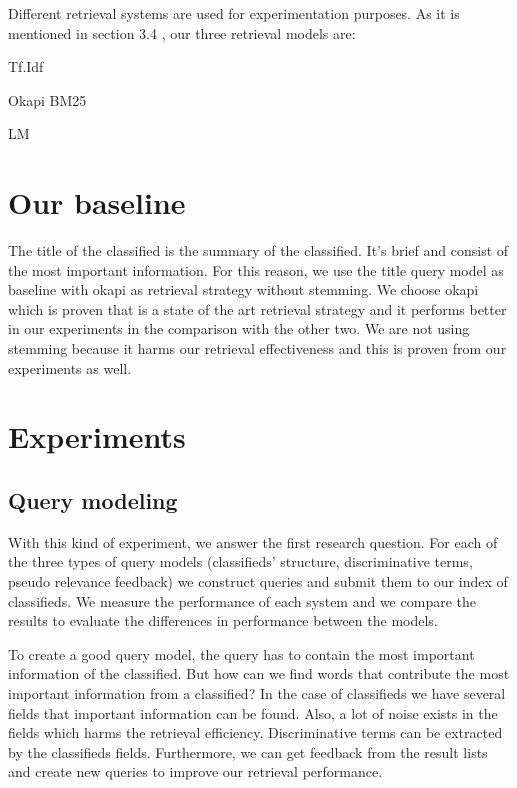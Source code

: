 Different retrieval systems are used for experimentation purposes. As it is mentioned in section 3.4 , our three retrieval models are:
\begin{list}{.}{}
\item{Tf.Idf}
\item{Okapi BM25}
\item{LM}
\end{list}

\section{Our baseline}
The title of the classified is the summary of the classified. It's brief and consist of the most important information. For this reason, we use the title query model as baseline with okapi as retrieval strategy without stemming. We choose okapi which is proven that is a state of the art retrieval strategy and it performs better in our experiments in the comparison with the other two. We are not using stemming because it harms our retrieval effectiveness and this is proven from our experiments as well.


\section{Experiments}

\subsection{Query modeling}
With this kind of experiment, we answer the first research question. For each of the three types of query models (classifieds' structure, discriminative terms, pseudo relevance feedback) we construct queries and submit them to our index of classifieds. We measure the performance of each system and we compare the results to evaluate the differences in performance between the models.


To create a good query model, the query has to contain the most important information of the classified. But how can we find words that contribute the most important information from a classified? In the case of classifieds we have several fields that important information can be found. Also, a lot of noise exists in the fields which harms the retrieval efficiency. Discriminative terms can be extracted by the classifieds fields. Furthermore, we can get feedback from the result lists and create new queries to improve our retrieval performance.


